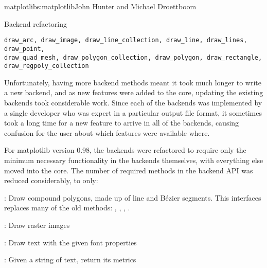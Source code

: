 \begin{aosachapter}{matplotlib}{s:matplotlib}{John Hunter and Michael Droettboom}
\begin{aosasect1}{Backend refactoring}
\begin{verbatim}
draw_arc, draw_image, draw_line_collection, draw_line, draw_lines, draw_point,
draw_quad_mesh, draw_polygon_collection, draw_polygon, draw_rectangle,
draw_regpoly_collection
\end{verbatim}

Unfortunately, having more backend methods meant it took much longer
to write a new backend, and as new features were added to the core,
updating the existing backends took considerable work.  Since each of
the backends was implemented by a single developer who was expert in a
particular output file format, it sometimes took a long time for a new
feature to arrive in all of the backends, causing confusion for the
user about which features were available where.

For matplotlib version 0.98, the backends were refactored to require
only the minimum necessary functionality in the backends themselves,
with everything else moved into the core.  The number of required
methods in the backend API was reduced considerably, to only:

\begin{aosaitemize}

  \item {}: Draw compound polygons, made up of line and
    B\'ezier segments.  This interfaces replaces many of the old
    methods: , , ,
    .

  \item {}: Draw raster images

  \item {}: Draw text with the given font properties

  \item {}: Given a string of
    text, return its metrics

\end{aosaitemize}


\end{aosasect1}
\end{aosachapter}

